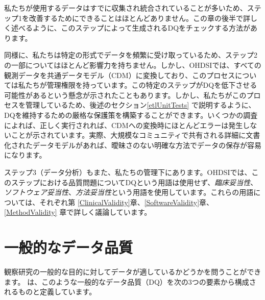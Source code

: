 \documentclass[
  11pt]{book}
\theoremstyle{definition}
\theoremstyle{definition}
\theoremstyle{definition}
\theoremstyle{definition}
\theoremstyle{remark}
\begin{document}
私たちが使用するデータはすでに収集され統合されていることが多いため、ステップ1を改善するためにできることはほとんどありません。この章の後半で詳しく述べるように、このステップによって生成されるDQをチェックする方法があります。

同様に、私たちは特定の形式でデータを頻繁に受け取っているため、ステップ2の一部についてはほとんど影響力を持ちません。しかし、OHDSIでは、すべての観測データを共通データモデル（CDM）に変換しており、このプロセスについては私たちが管理権限を持っています。この特定のステップがDQを低下させる可能性があるという懸念が示されたこともあります。しかし、私たちがこのプロセスを管理しているため、後述のセクション\ref{etlUnitTests} で説明するように、DQを維持するための厳格な保護策を構築することができます。いくつかの調査\citep{defalco_2013, makadia_2014, matcho_2014, voss_2015, voss_2015b, hripcsak_2018} によれば、正しく実行されれば、CDMへの変換時にほとんどエラーは発生しないことが示されています。実際、大規模なコミュニティで共有される詳細に文書化されたデータモデルがあれば、曖昧さのない明確な方法でデータの保存が容易になります。

ステップ3（データ分析）もまた、私たちの管理下にあります。OHDSIでは、このステップにおける品質問題についてDQという用語は使用せず、\emph{臨床妥当性}、\emph{ソフトウェア妥当性}、\emph{方法妥当性}という用語を使用しています。これらの用語については、それぞれ第 \ref{ClinicalValidity}章、\ref{SoftwareValidity}章、\ref{MethodValidity} 章で詳しく議論しています。

\section{一般的なデータ品質}\label{ux4e00ux822cux7684ux306aux30c7ux30fcux30bfux54c1ux8cea}

観察研究の一般的な目的に対してデータが適しているかどうかを問うことができます。\citet{kahn_harmonized_2016} は、このような一般的なデータ品質（DQ）を次の3つの要素から構成されるものと定義しています。
\end{document}
